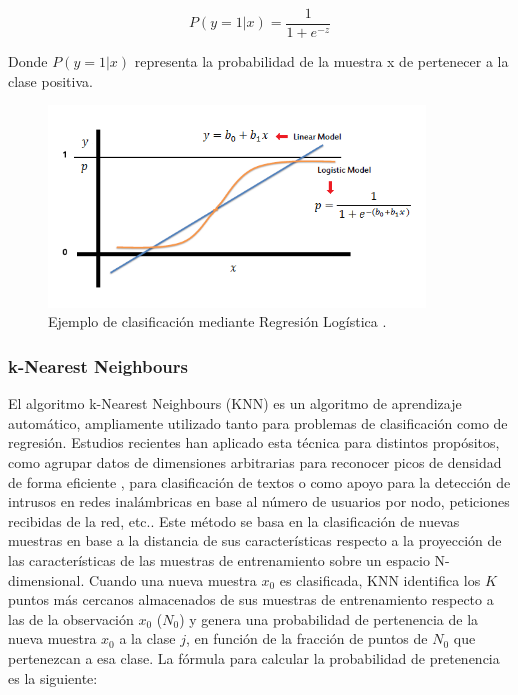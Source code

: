 \documentclass{uathesis-es}
\begin{document}
\[
    P(y = 1 | x) = \frac{1}{1 + e^{-z}}
\]

Donde $P(y = 1 | x)$ representa la probabilidad de la muestra x de pertenecer a la clase positiva.


\begin{figure}[H]
    \centering
    \includegraphics[width=10cm]{Figures/Background/LogReg_1.png}
    \caption{Ejemplo de clasificación mediante Regresión Logística \cite{LR}.}
    \label{LR_BACKGROUND}
\end{figure}


\subsubsection*{k-Nearest Neighbours}

El algoritmo k-Nearest Neighbours (KNN) es un algoritmo de aprendizaje automático, ampliamente utilizado tanto para problemas de clasificación como de regresión. Estudios recientes han aplicado esta técnica para distintos propósitos, como agrupar datos de dimensiones arbitrarias para reconocer picos de densidad de forma eficiente \cite{chen2020fast}, para clasificación de textos \cite{CHEN2020523} o como apoyo para la detección de intrusos en redes inalámbricas \cite{liu2022enhanced} en base al número de usuarios por nodo, peticiones recibidas de la red, etc.. Este método se basa en la clasificación de nuevas muestras en base a la distancia de sus características respecto a la proyección de las características de las muestras de entrenamiento sobre un espacio N-dimensional. Cuando una nueva muestra $x_0$ es clasificada, KNN identifica los $K$ puntos más cercanos almacenados de sus muestras de entrenamiento respecto a las de la observación $x_0$ ($N_0$) y genera una probabilidad de pertenencia de la nueva muestra $x_0$ a la clase $j$, en función de la fracción de puntos de $N_0$ que pertenezcan a esa clase. La fórmula para calcular la probabilidad de pretenencia es la siguiente:
\end{document}
